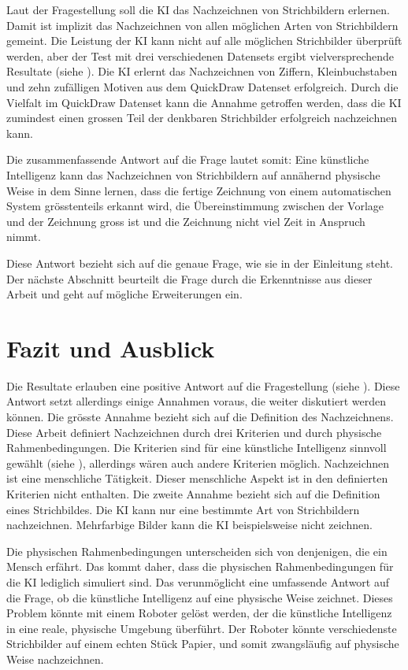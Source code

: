 Laut der Fragestellung soll die KI das Nachzeichnen von Strichbildern erlernen.
Damit ist implizit das Nachzeichnen von allen möglichen Arten von Strichbildern
gemeint. Die Leistung der KI kann nicht auf alle möglichen Strichbilder
überprüft werden, aber der Test mit drei verschiedenen Datensets ergibt
vielversprechende Resultate (siehe ). Die KI erlernt das
Nachzeichnen von Ziffern, Kleinbuchstaben und zehn zufälligen Motiven aus dem
QuickDraw Datenset erfolgreich. Durch die Vielfalt im QuickDraw Datenset kann
die Annahme getroffen werden, dass die KI zumindest einen grossen Teil der
denkbaren Strichbilder erfolgreich nachzeichnen kann.
 
Die zusammenfassende Antwort auf die Frage lautet somit: Eine künstliche
Intelligenz kann das Nachzeichnen von Strichbildern auf annähernd physische Weise
in dem Sinne lernen, dass die fertige Zeichnung von einem automatischen System
grösstenteils erkannt wird, die Übereinstimmung zwischen der Vorlage und der
Zeichnung gross ist und die Zeichnung nicht viel Zeit in Anspruch nimmt.
 
Diese Antwort bezieht sich auf die genaue Frage, wie sie in der Einleitung steht.
Der nächste Abschnitt beurteilt die Frage durch die Erkenntnisse aus dieser
Arbeit und geht auf mögliche Erweiterungen ein.
 
 
\section{Fazit und Ausblick}\label{chap:d_faz-aus} Die Resultate erlauben eine
positive Antwort auf die Fragestellung (siehe ).
Diese Antwort setzt allerdings einige Annahmen voraus, die weiter diskutiert
werden können. Die grösste Annahme bezieht sich auf die Definition des
Nachzeichnens. Diese Arbeit definiert Nachzeichnen durch drei Kriterien und
durch physische Rahmenbedingungen. Die Kriterien sind für eine künstliche
Intelligenz sinnvoll gewählt (siehe ),
allerdings wären auch andere Kriterien möglich. Nachzeichnen ist eine
menschliche Tätigkeit. Dieser menschliche Aspekt ist in den definierten
Kriterien nicht enthalten. Die zweite Annahme bezieht sich auf die Definition
eines Strichbildes. Die KI kann nur eine bestimmte Art von Strichbildern
nachzeichnen. Mehrfarbige Bilder kann die KI beispielsweise nicht zeichnen.
 
Die physischen Rahmenbedingungen unterscheiden sich von denjenigen, die ein
Mensch erfährt. Das kommt daher, dass die physischen Rahmenbedingungen für die KI
lediglich simuliert sind. Das verunmöglicht eine umfassende Antwort auf die
Frage, ob die künstliche Intelligenz auf eine physische Weise zeichnet. Dieses
Problem könnte mit einem Roboter gelöst werden, der die künstliche Intelligenz
in eine reale, physische Umgebung überführt. Der Roboter könnte verschiedenste
Strichbilder auf einem echten Stück Papier, und somit zwangsläufig auf physische
Weise nachzeichnen.
 
